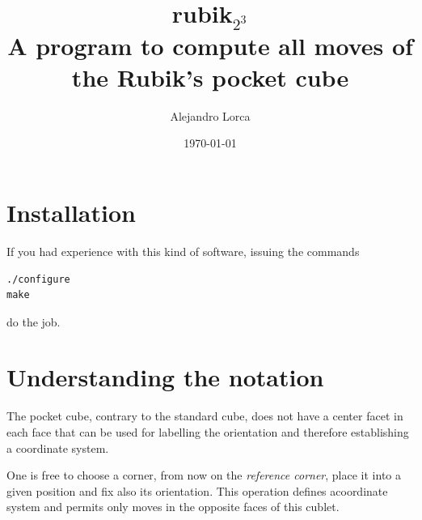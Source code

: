 \documentclass[a4paper,12pt]{article}
\def\rubik{rubik$_{2^3}$}
\begin{document}
\title{\Huge \rubik\\
{\normalsize A program to compute all moves of the Rubik's pocket cube}\vspace{3em}
}
\author{Alejandro Lorca}
\date{\today}
\maketitle

\section{Installation}

If you had experience with this kind of software, issuing the commands
\begin{verbatim}
./configure
make
\end{verbatim}
do the job.
\section{Understanding the notation}
The pocket cube, contrary to the standard cube, does not have a center
facet in each face that can be used for labelling the orientation and
therefore establishing a coordinate system. 

One is free to choose a corner, from now on the {\sl reference
  corner}, place it into a given position and fix also its
orientation. This operation defines acoordinate system and permits
only moves in the opposite faces of this cublet.
\end{document}
